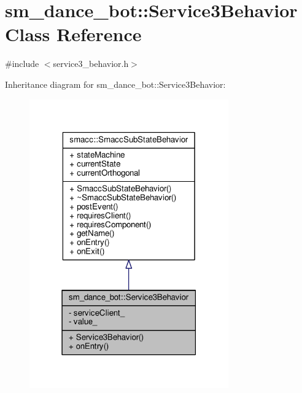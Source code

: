 \hypertarget{classsm__dance__bot_1_1Service3Behavior}{}\section{sm\+\_\+dance\+\_\+bot\+:\+:Service3\+Behavior Class Reference}
\label{classsm__dance__bot_1_1Service3Behavior}


{\ttfamily \#include $<$service3\+\_\+behavior.\+h$>$}



Inheritance diagram for sm\+\_\+dance\+\_\+bot\+:\+:Service3\+Behavior\+:
\nopagebreak
\begin{figure}[H]
\begin{center}
\leavevmode
\includegraphics[width=243pt]{classsm__dance__bot_1_1Service3Behavior__inherit__graph}
\end{center}
\end{figure}


